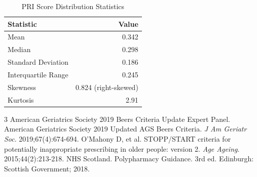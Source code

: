 \documentclass[11pt,a4paper]{article}
\begin{document}
\begin{table}[H]
\centering
\caption{PRI Score Distribution Statistics}
\label{tab:pri_stats}
\begin{tabular}{lr}
\toprule
\textbf{Statistic} & \textbf{Value} \\
\midrule
Mean & 0.342 \\
Median & 0.298 \\
Standard Deviation & 0.186 \\
Interquartile Range & 0.245 \\
Skewness & 0.824 (right-skewed) \\
Kurtosis & 2.91 \\
\bottomrule
\end{tabular}
\end{table}


\begin{thebibliography}{3}
 American Geriatrics Society 2019 Beers Criteria Update Expert Panel. American Geriatrics Society 2019 Updated AGS Beers Criteria. \textit{J Am Geriatr Soc}. 2019;67(4):674-694.
 O'Mahony D, et al. STOPP/START criteria for potentially inappropriate prescribing in older people: version 2. \textit{Age Ageing}. 2015;44(2):213-218.
 NHS Scotland. Polypharmacy Guidance. 3rd ed. Edinburgh: Scottish Government; 2018.
\end{thebibliography}
\end{document}
